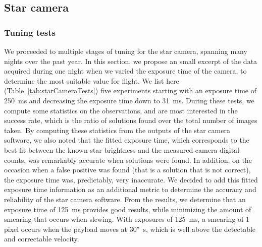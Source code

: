 \subsection{Star camera}

\subsubsection{Tuning tests}

We proceeded to multiple stages of tuning for the star camera, spanning many nights over the past year. In this section, we propose an small excerpt of the data acquired during one night when we varied the exposure time of the camera, to determine the most suitable value for flight. We list here (Table~\ref{tab:starCameraTests}) five experiments starting with an exposure time of \SI{250}{\milli\second} and decreasing the exposure time down to \SI{31}{\milli\second}. During these tests, we compute some statistics on the observations, and are most interested in the success rate, which is the ratio of solutions found over the total number of images taken. By computing these statistics from the outputs of the star camera software, we also noted that the fitted exposure time, which corresponds to the best fit between the known star brightness and the measured camera digital counts, was remarkably accurate when solutions were found. In addition, on the occasion when a false positive was found (that is a solution that is not correct), the exposure time was, predictably, very inaccurate. We decided to add this fitted exposure time information as an additional metric to determine the accuracy and reliability of the star camera software. From the results, we determine that an exposure time of \SI{125}{\milli\second} provides good results, while minimizing the amount of smearing that occurs when slewing. With exposures of \SI{125}{\milli\second}, a smearing of 1 pixel occurs when the payload moves at \ang{;;30}\si{\per\second}, which is well above the detectable and correctable velocity.



